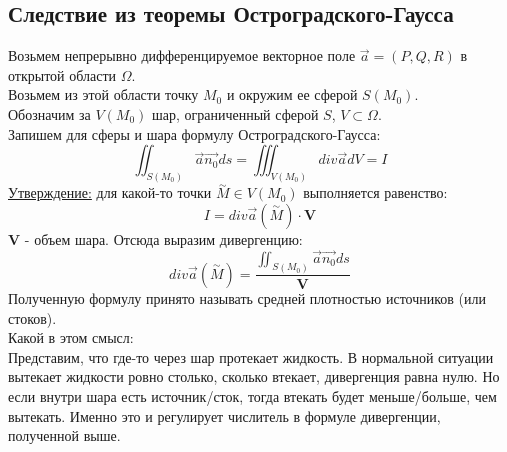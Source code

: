 \documentclass[12pt]{article}
\begin{document}
\subsection{Следствие из теоремы Остроградского-Гаусса}
Возьмем непрерывно дифференцируемое векторное поле $\overrightarrow{a} = (P,Q,R)$ в открытой области $\Omega$.\\
Возьмем из этой области точку $M_0$ и окружим ее сферой $S(M_0)$.\\
Обозначим за $V(M_0)$ шар, ограниченный сферой $S$, $V \subset \Omega$.\\
Запишем для сферы и шара формулу Остроградского-Гаусса:\\
$$\iint_{S(M_0)} \overrightarrow{a} \overrightarrow{n_0} ds =\iiint_{V(M_0)} div \overrightarrow{a} dV = I$$
\uline{Утверждение:} для какой-то точки $\overset{\sim}{M} \in V(M_0)$ выполняется равенство:\\
$$I = div \overrightarrow{a} (\overset{\sim}{M}) \cdot \textbf{V}$$
$\textbf{V}$ - объем шара. Отсюда выразим дивергенцию:\\
$$div \overrightarrow{a} (\overset{\sim}{M}) = \frac{\iint_{S(M_0)} \overrightarrow{a} \overrightarrow{n_0} ds}{\textbf{V}}$$
Полученную формулу принято называть средней плотностью источников (или стоков).\\
Какой в этом смысл:\\
Представим, что где-то через шар протекает жидкость. В нормальной ситуации вытекает жидкости ровно столько, сколько втекает, дивергенция равна нулю. Но если внутри шара есть источник/сток, тогда втекать будет меньше/больше, чем вытекать. Именно это и регулирует числитель в формуле дивергенции, полученной выше.\\
\end{document}

